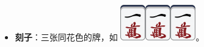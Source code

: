 \documentclass[
	lang=cn,
	color=green
]{elegantbook}
\begin{document}
\begin{remark}
    \begin{itemize}
        \item \textbf{刻子}：三张同花色的牌，如 \includegraphics[scale=0.5]{images/mahjong/1m.png}\includegraphics[scale=0.5]{images/mahjong/1m.png}\includegraphics[scale=0.5]{images/mahjong/1m.png}。

\end{itemize}
\end{remark}
\end{document}
